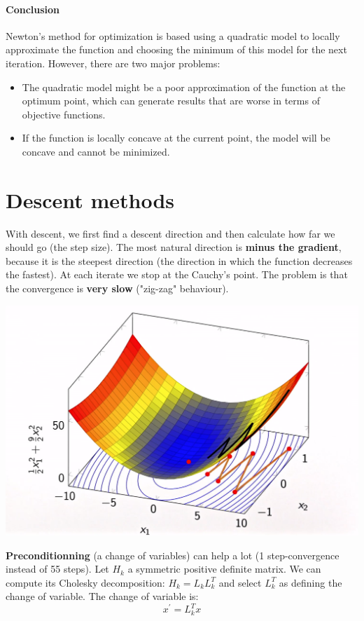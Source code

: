 \paragraph{Conclusion} Newton's method for optimization is based using a quadratic model to locally approximate the function and choosing the minimum of this model for the next iteration. However, there are two major problems:
\begin{itemize}
    \item The quadratic model might be a poor approximation of the function at the optimum point, which can generate results that are worse in terms of objective functions.
    \item If the function is locally concave at the current point, the model will be concave and cannot be minimized.
\end{itemize}


\section{Descent methods}


With descent, we first find a descent direction and then calculate how far we should go (the step size).
The most natural direction is \textbf{minus the gradient}, because it is the steepest direction (the direction in which the function decreases the fastest). At each iterate we stop at the Cauchy's point. The problem is that the convergence is \textbf{very slow} ("zig-zag" behaviour).


\includegraphics[width=\linewidth]{content/steepest_descent_problems.png}

\textbf{Preconditionning} (a change of variables) can help a lot (1 step-convergence instead of 55 steps). Let $H_k$ a symmetric positive definite matrix. We can compute its Cholesky decomposition: $H_k=L_kL_k^T$ and select $L_k^T$ as defining the change of variable.
The change of variable is:
\begin{equation}
    x^{\prime} = L_k^T x
\end{equation}

